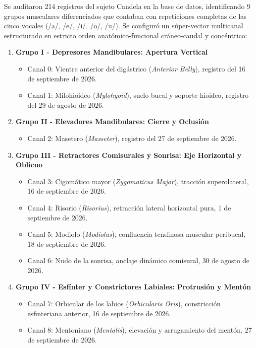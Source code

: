 \documentclass[11pt,a4paper]{article}
\begin{document}
Se auditaron 214 registros del sujeto Candela en la base de datos, identificando 9 grupos musculares diferenciados que contaban con repeticiones completas de las cinco vocales (/a/, /e/, /i/, /o/, /u/). Se configuró un súper-vector multicanal estructurado en estricto orden anatómico-funcional cráneo-caudal y concéntrico:
\begin{enumerate}
    \item \textbf{Grupo I - Depresores Mandibulares: Apertura Vertical}
    \begin{itemize}
        \item Canal 0: Vientre anterior del digástrico (\textit{Anterior Belly}), registro del 16 de septiembre de 2026.
        \item Canal 1: Milohioideo (\textit{Mylohyoid}), suelo bucal y soporte hioideo, registro del 29 de agosto de 2026.
    \end{itemize}
    \item \textbf{Grupo II - Elevadores Mandibulares: Cierre y Oclusión}
    \begin{itemize}
        \item Canal 2: Masetero (\textit{Masseter}), registro del 27 de septiembre de 2026.
    \end{itemize}
    \item \textbf{Grupo III - Retractores Comisurales y Sonrisa: Eje Horizontal y Oblicuo}
    \begin{itemize}
        \item Canal 3: Cigomático mayor (\textit{Zygomaticus Major}), tracción superolateral, 16 de septiembre de 2026.
        \item Canal 4: Risorio (\textit{Risorius}), retracción lateral horizontal pura, 1 de septiembre de 2026.
        \item Canal 5: Modiolo (\textit{Modiolus}), confluencia tendinosa muscular peribucal, 18 de septiembre de 2026.
        \item Canal 6: Nudo de la sonrisa, anclaje dinámico comisural, 30 de agosto de 2026.
    \end{itemize}
    \item \textbf{Grupo IV - Esfínter y Constrictores Labiales: Protrusión y Mentón}
    \begin{itemize}
        \item Canal 7: Orbicular de los labios (\textit{Orbicularis Oris}), constricción esfinteriana anterior, 16 de septiembre de 2026.
        \item Canal 8: Mentoniano (\textit{Mentalis}), elevación y arrugamiento del mentón, 27 de septiembre de 2026.
    \end{itemize}
\end{enumerate}
\end{document}

